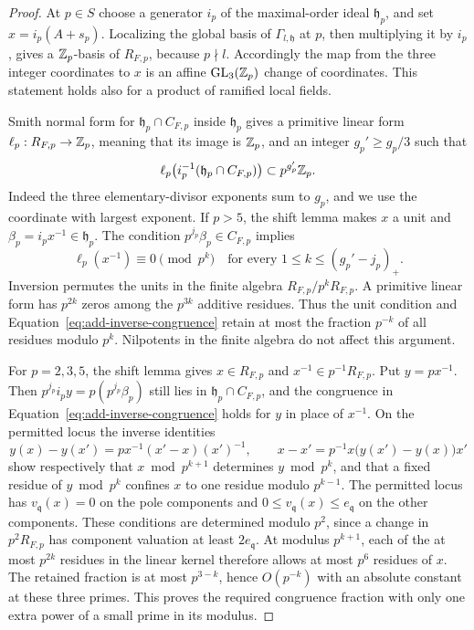 \begin{proof}
At \(p\in S\) choose a generator \(i_p\) of the maximal-order ideal
\(\mathfrak h_p\), and set \(x=i_p(A+s_p)\).  Localizing the global basis
of \(\Gamma_{l,\mathfrak h}\) at \(p\), then multiplying it by \(i_p\), gives
a \(\mathbb Z_p\)-basis of \(R_{F,p}\), because \(p\nmid l\).  Accordingly the
map from the three integer coordinates to \(x\) is an affine
\(\operatorname{GL}_3(\mathbb Z_p)\) change of coordinates.  This statement holds
also for a product of ramified local fields.

Smith normal form for \(\mathfrak h_p\cap C_{F,p}\) inside \(\mathfrak h_p\)
gives a primitive linear form \(\ell_p:R_{F,p}\to\mathbb Z_p\), meaning that its
image is \(\mathbb Z_p\), and an integer
\(g_p'\ge g_p/3\) such that
\[
 \ell_p\bigl(i_p^{-1}(\mathfrak h_p\cap C_{F,p})\bigr)
       \subset p^{g_p'}\mathbb Z_p.
\]
Indeed the three elementary-divisor exponents sum to \(g_p\), and we use
the coordinate with largest exponent.  If \(p>5\), the shift lemma makes
\(x\) a unit and \(\beta_p=i_px^{-1}\in\mathfrak h_p\).  The condition
\(p^{j_p}\beta_p\in C_{F,p}\) implies
\begin{equation}
 \ell_p(x^{-1})\equiv0\pmod {p^k}
       \quad\text{for every }1\le k\le(g_p'-j_p)_+.
 \label{eq:add-inverse-congruence}
\end{equation}
Inversion permutes the units in the finite algebra
\(R_{F,p}/p^kR_{F,p}\).  A primitive linear form has \(p^{2k}\) zeros among
the \(p^{3k}\) additive residues.  Thus the unit condition and
Equation~\eqref{eq:add-inverse-congruence} retain at most the fraction
\(p^{-k}\) of all residues modulo \(p^k\).  Nilpotents in the finite algebra
do not affect this argument.

For \(p=2,3,5\), the shift lemma gives \(x\in R_{F,p}\) and
\(x^{-1}\in p^{-1}R_{F,p}\).  Put \(y=p x^{-1}\).  Then
\(p^{j_p}i_py=p(p^{j_p}\beta_p)\) still lies in
\(\mathfrak h_p\cap C_{F,p}\), and the congruence in
Equation~\eqref{eq:add-inverse-congruence} holds for \(y\) in place of
\(x^{-1}\).  On the permitted locus the inverse identities
\[
 y(x)-y(x')=p x^{-1}(x'-x)(x')^{-1},\qquad
 x-x'=p^{-1}x\bigl(y(x')-y(x)\bigr)x'
\]
show respectively that \(x\bmod p^{k+1}\) determines \(y\bmod p^k\), and
that a fixed residue of \(y\bmod p^k\) confines \(x\) to one residue modulo
\(p^{k-1}\).  The permitted locus has \(v_{\mathfrak q}(x)=0\) on the pole
components and \(0\le v_{\mathfrak q}(x)\le e_{\mathfrak q}\) on the other
components.  These conditions are determined modulo \(p^2\), since a
change in \(p^2R_{F,p}\) has component valuation at least \(2e_{\mathfrak q}\).
At modulus \(p^{k+1}\), each of the at most \(p^{2k}\) residues in
the linear kernel therefore allows at most \(p^6\) residues of \(x\).
The retained fraction is at most \(p^{3-k}\), hence \(O(p^{-k})\) with an
absolute constant at these three primes.  This proves the required
congruence fraction with only one extra power of a small prime in its
modulus.


\end{proof}
